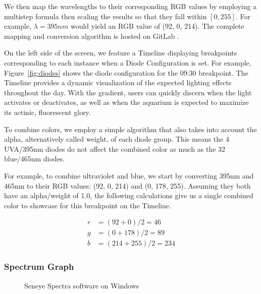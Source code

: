 \documentclass[8pt,twocolumn]{article}
\newcommand{\xssub}[1]{\bigskip\noindent{\small\textbf{#1}}\smallskip}
\begin{document}
We then map the wavelengths to their corresponding RGB values by employing a multistep formula then scaling the results so that they fall within $[0, 255]$. For example, $\lambda = 395nm$ would yield an RGB value of (92, 0, 214). The complete mapping and conversion algorithm is hosted on GitLab \cite{codebase}.


\xssub{Timeline}

\noindent On the left side of the screen, we feature a Timeline displaying breakpoints corresponding to each instance when a Diode Configuration is set. For example, Figure~\ref{fig:diodes} shows the diode configuration for the 09:30 breakpoint. The Timeline provides a dynamic visualization of the expected lighting effects throughout the day. With the gradient, users can quickly discern when the light activates or deactivates, as well as when the aquarium is expected to maximize its actinic, fluorescent glory.


\xssub{Combining RGBs}

\noindent To combine colors, we employ a simple algorithm that also takes into account the alpha, alternatively called weight, of each diode group. This means the 4 UVA/395nm diodes do not affect the combined color as much as the 32 blue/465nm diodes.

For example, to combine ultraviolet and blue, we start by converting 395nm and 465nm to their RGB values: (92, 0, 214) and (0, 178, 255). Assuming they both have an alpha/weight of 1.0, the following calculations give us a single combined color to showcase for this breakpoint on the Timeline.

\begin{align*}
	r &= (92 + 0) / 2 = 46 \\ g &= (0 + 178) / 2 = 89 \\ b &= (214 + 255) / 2 = 234
\end{align*}

\subsubsection{Spectrum Graph}

\begin{figure}[!htp]
    \centering
    \caption{Seneye Spectra software on Windows\label{fig:seneye_spectra}}
\end{figure}
\end{document}
